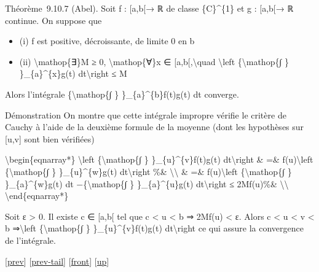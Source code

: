 \documentclass[]{article}
\begin{document}
Théorème~9.10.7 (Abel). Soit f : {[}a,b{[}→ ℝ de classe \{C\}\^{}\{1\}
et g : {[}a,b{[}→ ℝ continue. On suppose que

\begin{itemize}
\itemsep1pt\parskip0pt
\item
  (i) f est positive, décroissante, de limite 0 en b
\item
  (ii) \textbackslash{}mathop\{∃\}M ≥ 0, \textbackslash{}mathop\{∀\}x ∈
  {[}a,b{[},\textbackslash{}quad \textbackslash{}left
  \textbar{}\{\textbackslash{}mathop\{∫ \} \}\_\{a\}\^{}\{x\}g(t)
  dt\textbackslash{}right \textbar{}≤ M
\end{itemize}

Alors l'intégrale \{\textbackslash{}mathop\{∫ \}
\}\_\{a\}\^{}\{b\}f(t)g(t) dt converge.

Démonstration On montre que cette intégrale impropre vérifie le critère
de Cauchy à l'aide de la deuxième formule de la moyenne (dont les
hypothèses sur {[}u,v{]} sont bien vérifiées)

\textbackslash{}begin\{eqnarray*\} \textbackslash{}left
\textbar{}\{\textbackslash{}mathop\{∫ \} \}\_\{u\}\^{}\{v\}f(t)g(t)
dt\textbackslash{}right \textbar{}\& =\& f(u)\textbackslash{}left
\textbar{}\{\textbackslash{}mathop\{∫ \} \}\_\{u\}\^{}\{w\}g(t)
dt\textbackslash{}right \textbar{} \%\& \textbackslash{}\textbackslash{}
\& =\& f(u)\textbackslash{}left \textbar{}\{\textbackslash{}mathop\{∫ \}
\}\_\{a\}\^{}\{w\}g(t) dt −\{\textbackslash{}mathop\{∫ \}
\}\_\{a\}\^{}\{u\}g(t) dt\textbackslash{}right \textbar{}≤ 2Mf(u)\%\&
\textbackslash{}\textbackslash{} \textbackslash{}end\{eqnarray*\}

Soit ε \textgreater{} 0. Il existe c ∈ {[}a,b{[} tel que c \textless{} u
\textless{} b ⇒ 2Mf(u) \textless{} ε. Alors c \textless{} u \textless{}
v \textless{} b ⇒\textbackslash{}left
\textbar{}\{\textbackslash{}mathop\{∫ \} \}\_\{u\}\^{}\{v\}f(t)g(t)
dt\textbackslash{}right \textbar{} ce qui assure la convergence de
l'intégrale.

{[}\href{coursse58.html}{prev}{]}
{[}\href{coursse58.html\#tailcoursse58.html}{prev-tail}{]}
{[}\href{coursse59.html}{front}{]}
{[}\href{coursch10.html\#coursse59.html}{up}{]}
\end{document}

